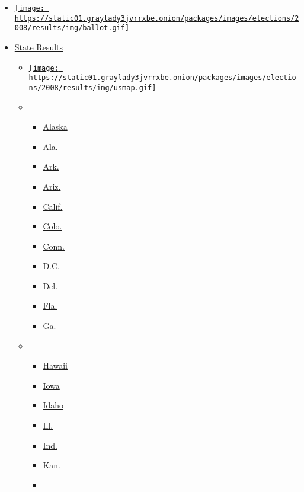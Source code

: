 \begin{itemize}
\tightlist
\item
  \href{map.html}{\texttt{[image: https://static01.graylady3jvrrxbe.onion/packages/images/elections/2008/results/img/ballot.gif]}}
\item
  \protect\hyperlink{}{State Results}

  \begin{itemize}
  \item
    \href{//www.adobe.com/shockwave/download/download.cgi?P1_Prod_Version=ShockwaveFlash}{\texttt{[image: https://static01.graylady3jvrrxbe.onion/packages/images/elections/2008/results/img/usmap.gif]}}
  \item
    \begin{itemize}
    \tightlist
    \item
      \href{../states/alaska.html}{Alaska}
    \item
      \href{../states/alabama.html}{Ala.}
    \item
      \href{../states/arkansas.html}{Ark.}
    \item
      \href{../states/arizona.html}{Ariz.}
    \item
      \href{../states/california.html}{Calif.}
    \item
      \href{../states/colorado.html}{Colo.}
    \item
      \href{../states/connecticut.html}{Conn.}
    \item
      \href{../states/district-of-columbia.html}{D.C.}
    \item
      \href{../states/delaware.html}{Del.}
    \item
      \href{../states/florida.html}{Fla.}
    \item
      \href{../states/georgia.html}{Ga.}
    \end{itemize}
  \item
    \begin{itemize}
    \tightlist
    \item
      \href{../states/hawaii.html}{Hawaii}
    \item
      \href{../states/iowa.html}{Iowa}
    \item
      \href{../states/idaho.html}{Idaho}
    \item
      \href{../states/illinois.html}{Ill.}
    \item
      \href{../states/indiana.html}{Ind.}
    \item
      \href{../states/kansas.html}{Kan.}
    \item

\end{itemize}
\end{itemize}
\end{itemize}
